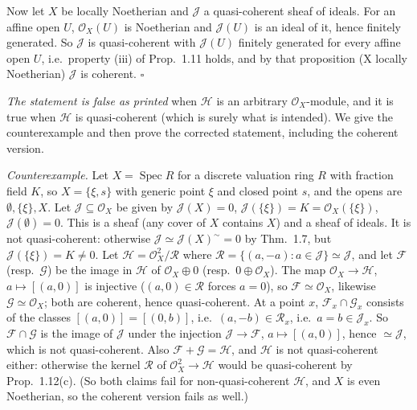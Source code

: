 \documentclass[11pt]{article}
\begin{document}
Now let $X$ be locally Noetherian and $\mathcal{J}$ a quasi-coherent sheaf of ideals. For an affine open $U$, $\mathcal{O}_X(U)$ is Noetherian and $\mathcal{J}(U)$ is an ideal of it, hence finitely generated. So $\mathcal{J}$ is quasi-coherent with $\mathcal{J}(U)$ finitely generated for every affine open $U$, i.e.\ property (iii) of Prop.~1.11 holds, and by that proposition (X locally Noetherian) $\mathcal{J}$ is coherent. \hfill$\square$

\pf
\emph{The statement is false as printed} when $\mathcal{H}$ is an arbitrary $\mathcal{O}_X$-module, and it is true when $\mathcal{H}$ is quasi-coherent (which is surely what is intended). We give the counterexample and then prove the corrected statement, including the coherent version.

\emph{Counterexample.} Let $X=\operatorname{Spec}R$ for a discrete valuation ring $R$ with fraction field $K$, so $X=\{\xi,s\}$ with generic point $\xi$ and closed point $s$, and the opens are $\emptyset,\{\xi\},X$. Let $\mathcal{J}\subseteq\mathcal{O}_X$ be given by $\mathcal{J}(X)=0$, $\mathcal{J}(\{\xi\})=K=\mathcal{O}_X(\{\xi\})$, $\mathcal{J}(\emptyset)=0$. This is a sheaf (any cover of $X$ contains $X$) and a sheaf of ideals. It is not quasi-coherent: otherwise $\mathcal{J}\simeq\mathcal{J}(X)^\sim=0$ by Thm.~1.7, but $\mathcal{J}(\{\xi\})=K\neq0$. Let $\mathcal{H}=\mathcal{O}_X^2/\mathcal{R}$ where $\mathcal{R}=\{(a,-a): a\in\mathcal{J}\}\simeq\mathcal{J}$, and let $\mathcal{F}$ (resp.\ $\mathcal{G}$) be the image in $\mathcal{H}$ of $\mathcal{O}_X\oplus0$ (resp.\ $0\oplus\mathcal{O}_X$). The map $\mathcal{O}_X\to\mathcal{H}$, $a\mapsto[(a,0)]$ is injective ($(a,0)\in\mathcal{R}$ forces $a=0$), so $\mathcal{F}\simeq\mathcal{O}_X$, likewise $\mathcal{G}\simeq\mathcal{O}_X$; both are coherent, hence quasi-coherent. At a point $x$, $\mathcal{F}_x\cap\mathcal{G}_x$ consists of the classes $[(a,0)]=[(0,b)]$, i.e.\ $(a,-b)\in\mathcal{R}_x$, i.e.\ $a=b\in\mathcal{J}_x$. So $\mathcal{F}\cap\mathcal{G}$ is the image of $\mathcal{J}$ under the injection $\mathcal{J}\to\mathcal{F}$, $a\mapsto[(a,0)]$, hence $\simeq\mathcal{J}$, which is not quasi-coherent. Also $\mathcal{F}+\mathcal{G}=\mathcal{H}$, and $\mathcal{H}$ is not quasi-coherent either: otherwise the kernel $\mathcal{R}$ of $\mathcal{O}_X^2\to\mathcal{H}$ would be quasi-coherent by Prop.~1.12(c). (So both claims fail for non-quasi-coherent $\mathcal{H}$, and $X$ is even Noetherian, so the coherent version fails as well.)
\end{document}
